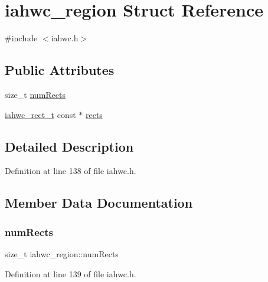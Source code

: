 \hypertarget{structiahwc__region}{}\section{iahwc\+\_\+region Struct Reference}
\label{structiahwc__region}


{\ttfamily \#include $<$iahwc.\+h$>$}

\subsection*{Public Attributes}
\begin{DoxyCompactItemize}
\item 
size\+\_\+t \mbox{\hyperlink{structiahwc__region_a72a48239f66d9b87cc76a2bbbbdc48a1}{num\+Rects}}
\item 
\mbox{\hyperlink{iahwc_8h_a163ae45b2470c0d300fe4ec4d017a603}{iahwc\+\_\+rect\+\_\+t}} const  $\ast$ \mbox{\hyperlink{structiahwc__region_a94a878c575f670019f83b1cac59094a5}{rects}}
\end{DoxyCompactItemize}


\subsection{Detailed Description}


Definition at line 138 of file iahwc.\+h.



\subsection{Member Data Documentation}
\mbox{\label{structiahwc__region_a72a48239f66d9b87cc76a2bbbbdc48a1}} 
\subsubsection{\texorpdfstring{num\+Rects}{numRects}}
{\footnotesize\ttfamily size\+\_\+t iahwc\+\_\+region\+::num\+Rects}



Definition at line 139 of file iahwc.\+h.

\mbox{\label{structiahwc__region_a94a878c575f670019f83b1cac59094a5}} 
